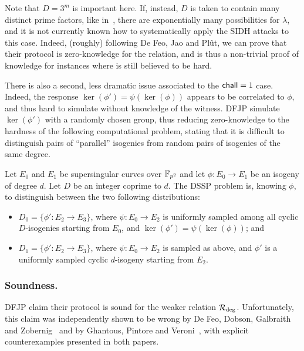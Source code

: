 Note that $D = 3^m$ is important here.
If, instead, $D$ is taken to contain many distinct prime factors, like in~\cite{cryptoeprint:2023/013}, there are exponentially many possibilities for $\lambda$, and it is not currently known how to systematically apply the SIDH attacks to this case.
Indeed, (roughly) following De Feo, Jao and Plût, we can prove that their protocol is zero-knowledge for the \R[M-SIDH] relation, and is thus a non-trivial proof of knowledge for instances where \R[M-SIDH] is still believed to be hard.

There is also a second, less dramatic issue associated to the $\chall = 1$ case.
Indeed, the response $\ker(\phi') = \psi(\ker(\phi))$ appears to be correlated to $\phi$, and thus hard to simulate without knowledge of the witness.
DFJP simulate $\ker(\phi')$ with a randomly chosen group, thus reducing zero-knowledge to the hardness of the following computational problem, stating that it is difficult to distinguish pairs of ``parallel'' isogenies from random pairs of isogenies of the same degree.

\begin{definition}\label{defn:DSSP}
    Let $E_0$ and $E_1$ be supersingular curves over $\F_{p^2}$ and let $\phi :E_0 \to E_1$ be an isogeny of degree $d$.
    Let $D$ be an integer coprime to $d$.
    The DSSP problem is, knowing $\phi$, to distinguish between the two following distributions:
    \begin{itemize}
        \item $D_0 = \{ \phi' : E_2 \to E_3 \}$, where $\psi : E_0 \to E_2$ is uniformly sampled among all cyclic $D$-isogenies starting from $E_0$, and $\ker(\phi') = \psi(\ker(\phi))$; and
        \item $D_1 = \{ \phi' : E_2 \to E_3 \}$, where $\psi : E_0 \to E_2$ is sampled as above, and $\phi'$ is a uniformly sampled cyclic $d$-isogeny starting from $E_2$.
    \end{itemize}
\end{definition}


\subsubsection{Soundness.}
DFJP claim their protocol is sound for the weaker relation $\R[deg]$.
Unfortunately, this claim was independently shown to be wrong by De Feo, Dobson, Galbraith and Zobernig~\cite{DFDGZ21} and by Ghantous, Pintore and Veroni~\cite{GPV21}, with explicit counterexamples presented in both papers.

